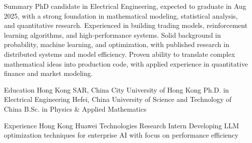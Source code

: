\documentclass[caps, english]{financecv}
\begin{document}
\begin{cvsection}{Summary}
PhD candidate in Electrical Engineering, expected to graduate in Aug 2025, with a strong foundation in mathematical modeling, statistical analysis, and quantitative research. Experienced in building trading models, reinforcement learning algorithms, and high-performance systems. Solid background in probability, machine learning, and optimization, with published research in distributed systems and model efficiency. Proven ability to translate complex mathematical ideas into production code, with applied experience in quantitative finance and market modeling.
\end{cvsection}

\begin{cvsection}{Education}
{Hong Kong SAR, China}
{City University of Hong Kong}
{Ph.D. in Electrical Engineering}
{}
{}
{}
{}
{Hefei, China}
{University of Science and Technology of China}
{B.Sc. in Physics \& Applied Mathematics}
{}
{}
{}
{}
\end{cvsection}

\begin{cvsection}{Experience}
{Hong Kong}
{Huawei Technologies}
{Research Intern}
{Developing LLM optimization techniques for enterprise AI with focus on performance efficiency}
{}
{}
{}
\end{cvsection}
\end{document}

